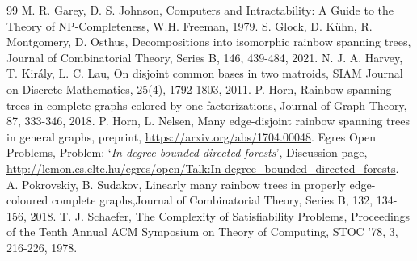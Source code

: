 \documentclass{article}
\begin{document}
\begin{thebibliography}{99}
 M. R. Garey, D. S. Johnson, Computers and Intractability: A Guide to the Theory of NP-Completeness, W.H. Freeman, 1979.
 S. Glock, D. K\"uhn, R. Montgomery, D. Osthus, Decompositions into isomorphic rainbow spanning trees, Journal of Combinatorial Theory, Series B, 146, 439-484, 2021.
 N. J. A. Harvey, T. Király, L. C. Lau, On disjoint common bases in two matroids, SIAM Journal on Discrete Mathematics, 25(4), 1792-1803, 2011.
 P. Horn, Rainbow spanning trees in complete graphs colored by one-factorizations, Journal of Graph Theory, 87, 333-346, 2018.
 P. Horn, L. Nelsen, Many edge-disjoint rainbow spanning trees in general graphs, preprint, \url{https://arxiv.org/abs/1704.00048}.
 Egres Open Problems, Problem: `{\it In-degree bounded directed forests}', Discussion page, \url{http://lemon.cs.elte.hu/egres/open/Talk:In-degree_bounded_directed_forests}.
 A. Pokrovskiy, B. Sudakov, Linearly many rainbow trees in properly edge-coloured complete graphs,Journal of Combinatorial Theory, Series B, 132, 134-156, 2018.
 T. J. Schaefer, The Complexity of Satisfiability Problems,   Proceedings of the Tenth Annual ACM Symposium on Theory of Computing, STOC ’78, 3, 216-226, 1978.
\end{thebibliography}
\end{document}
